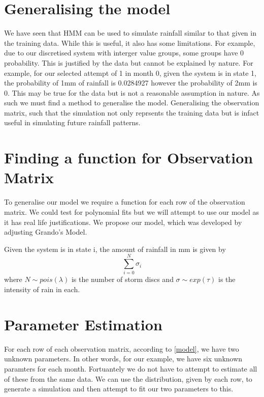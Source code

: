 \section{Generalising the model}

We have seen that HMM can be used to simulate rainfall similar to that given in the training data. While this is useful, it also has some limitations. For example, due to our discretised system with interger value groups, some groups have 0 probability. This is justified by the data but cannot be explained by nature. For example, for our selected attempt of 1 in month 0, given the system is in state 1, the probability of 1mm of rainfall is 0.0284927 however the probability of 2mm is 0. This may be true for the data but is not a reasonable assumption in nature. As such we must find a method to generalise the model. Generalising the observation matrix, such that the simulation not only reprsents the training data but is infact useful in simulating future rainfall patterns.

\section{Finding a function for Observation Matrix}

To generalise our model we require a function for each row of the observation matrix. We could test for polynomial fits but we will attempt to use our model as it has real life justifications. We propose our model, which was developed by adjusting Grando's Model.

\begin{prop}
    \label{model}
    Given the system is in state i, the amount of rainfall in mm is given by
    \begin{equation}
        \sum_{i=0}^N \sigma_i
    \end{equation}
    where $N \sim pois(\lambda)$ is the number of storm discs and $\sigma \sim exp(\tau)$ is the intensity of rain in each.
\end{prop}



\section{Parameter Estimation}


For each row of each observation matrix, according to \ref{model}, we have two unknown parameters. In other words, for our example, we have six unknown paramters for each month. Fortuantely we do not have to attempt to estimate all of these from the same data. We can use the distribution, given by each row, to generate a simulation and then attempt to fit our two parameters to this.


